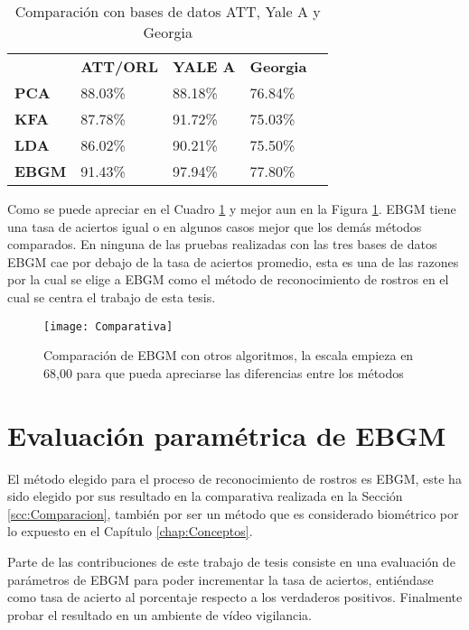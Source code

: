 \begin{table}[h]
\centering
\caption{Comparación con bases de datos ATT, Yale A y Georgia}
\label{Tcomparacion}
\begin{tabular}{|l|l|l|l|l}
\cline{1-4}
              & \textbf{ATT/ORL} & \textbf{YALE A} & \textbf{Georgia} &  \\ \cline{1-4}
\textbf{PCA}  & 88.03\%          & 88.18\%         & 76.84\%          &  \\ \cline{1-4}
\textbf{KFA}  & 87.78\%          & 91.72\%         & 75.03\%          &  \\ \cline{1-4}
\textbf{LDA}  & 86.02\%          & 90.21\%         & 75.50\%          &  \\ \cline{1-4}
\textbf{EBGM} & 91.43\%          & 97.94\%         & 77.80\%          &  \\ \cline{1-4}
\end{tabular}
\end{table}
Como se puede apreciar en el Cuadro \ref{Tcomparacion} y mejor aun en la Figura \ref{Fcomparacion}. \ac{EBGM} tiene una tasa de aciertos igual o en algunos casos mejor que los demás métodos comparados. En ninguna de las pruebas realizadas con las tres bases de datos \ac{EBGM} cae por debajo de la tasa de aciertos promedio, esta es una de las razones por la cual se elige a \ac{EBGM} como el método de reconocimiento de rostros en el cual se centra el trabajo de esta tesis.

\begin{figure}[h]
\center
	\texttt{[image: Comparativa]}
    \caption{Comparación de \ac{EBGM} con otros algoritmos, la escala empieza en 68,00 para que pueda apreciarse las diferencias entre los métodos}
    \label{Fcomparacion}
\end{figure}
\section{Evaluación paramétrica de \ac{EBGM}}

El método elegido para el proceso de reconocimiento de rostros es \ac{EBGM}, este ha sido elegido por sus resultado en la comparativa realizada en la Sección \ref{scc:Comparacion}, también por ser un método que es considerado biométrico por lo expuesto en el Capítulo \ref{chap:Conceptos}.

Parte de las contribuciones de este trabajo de tesis consiste en una evaluación de parámetros de \ac{EBGM} para poder incrementar la tasa de aciertos, entiéndase como tasa de acierto al porcentaje respecto a los verdaderos positivos. Finalmente probar el resultado en un ambiente de vídeo vigilancia.

